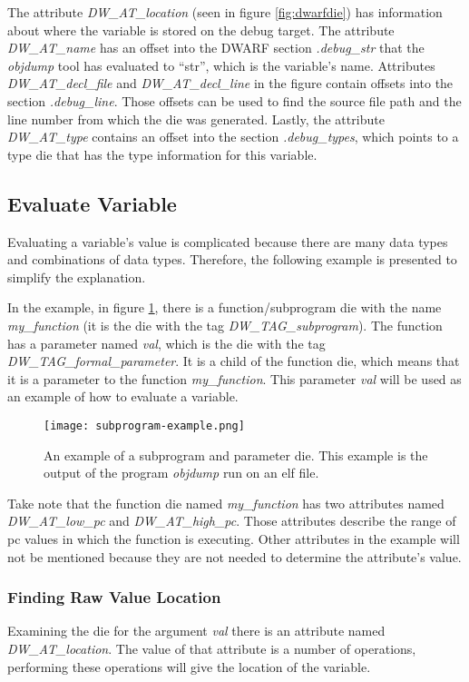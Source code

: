 The attribute \emph{DW\_AT\_location} (seen in figure \ref{fig:dwarfdie}) has information about where the variable is stored on the debug target.
The attribute \emph{DW\_AT\_name} has an offset into the \gls{DWARF} section \emph{.debug\_str} that the \emph{objdump} tool has evaluated to ``str'', which is the variable's name.
Attributes \emph{DW\_AT\_decl\_file} and \emph{DW\_AT\_decl\_line} in the figure contain offsets into the section \emph{.debug\_line}.
Those offsets can be used to find the source file path and the line number from which the \gls{die} was generated.
Lastly, the attribute \emph{DW\_AT\_type} contains an offset into the section \emph{.debug\_types}, which points to a type \gls{die} that has the type information for this variable.


\subsection{Evaluate Variable}
\label{sec:evaluate-variable}
Evaluating a variable's value is complicated because there are many data types and combinations of data types.
Therefore, the following example is presented to simplify the explanation.


In the example, in figure \ref{fig:subprogramexample}, there is a function/subprogram \gls{die} with the name \emph{my\_function} (it is the \gls{die} with the tag \emph{DW\_TAG\_subprogram}).
The function has a parameter named \emph{val}, which is the \gls{die} with the tag \emph{DW\_TAG\_formal\_parameter}.
It is a child of the function \gls{die}, which means that it is a parameter to the function \emph{my\_function}.
This parameter \emph{val} will be used as an example of how to evaluate a variable.


\begin{figure}[h]
	\centering
	\texttt{[image: subprogram-example.png]}
	\caption{An example of a subprogram and parameter \gls{die}. This example is the output of the program \emph{objdump} run on an \gls{elf} file.}
	\label{fig:subprogramexample}
\end{figure}


Take note that the function \gls{die} named \emph{my\_function} has two attributes named \emph{DW\_AT\_low\_pc} and \emph{DW\_AT\_high\_pc}.
Those attributes describe the range of \gls{pc} values in which the function is executing.
Other attributes in the example will not be mentioned because they are not needed to determine the attribute's value.


\subsubsection{Finding Raw Value Location}
Examining the \gls{die} for the argument \emph{val} there is an attribute named \emph{DW\_AT\_location}.
The value of that attribute is a number of operations, performing these operations will give the location of the variable.


